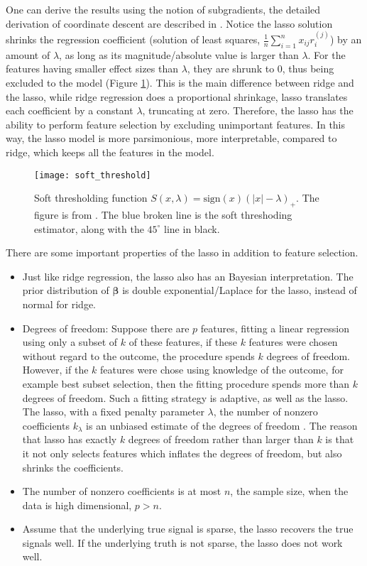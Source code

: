 One can derive the results using the notion of subgradients, the detailed derivation of coordinate descent are described in \cite{friedman2007pathwise}. Notice the lasso solution shrinks the regression coefficient (solution of least squares, $\frac{1}{n}\sum_{i=1}^{n}x_{ij}r_i^{(j)}$) by an amount of $\lambda$, as long as its magnitude/absolute value is larger than $\lambda$. For the features having smaller effect sizes than $\lambda$, they are shrunk to 0, thus being excluded to the model (Figure \ref{fig:soft_threshold}). This is the main difference between ridge and the lasso, while ridge regression does a proportional shrinkage, lasso translates each coefficient by a constant $\lambda$, truncating at zero. Therefore, the lasso has the ability to perform feature selection by excluding unimportant features. In this way, the lasso model is more parsimonious, more interpretable, compared to ridge, which keeps all the features in the model.
\begin{figure}[tbh]
  \centering
  \texttt{[image: soft\_threshold]}
  \caption[Soft thresholding function $S(x, \lambda)=\text{sign}(x)(|x|-\lambda)_+$]{
    Soft thresholding function $S(x, \lambda)=\text{sign}(x)(|x|-\lambda)_+$. The figure is from \cite{hastie2019statistical}. The blue broken line is the soft threshoding estimator, along with the $45^{\circ}$ line in black.
  }
  \label{fig:soft_threshold}
\end{figure}

There are some important properties of the lasso in addition to feature selection.
\begin{itemize}
    \item Just like ridge regression, the lasso also has an Bayesian interpretation. The prior distribution of $\bm{\beta}$ is double exponential/Laplace for the lasso, instead of normal for ridge.
    \item Degrees of freedom: Suppose there are $p$ features, fitting a linear regression using only a subset of $k$ of these features, if these $k$ features were chosen without regard to the outcome, the procedure spends $k$ degrees of freedom. However, if the $k$ features were chose using knowledge of the outcome, for example best subset selection, then the fitting procedure spends more than $k$ degrees of freedom. Such a fitting strategy is adaptive, as well as the lasso. The lasso, with a fixed penalty parameter $\lambda$, the number of nonzero coefficients $k_\lambda$ is an unbiased estimate of the degrees of freedom \citep{zou2007degrees, tibshirani2012degrees}. The reason that lasso has exactly $k$ degrees of freedom rather than larger than $k$ is that it not only selects features which inflates the degrees of freedom, but also shrinks the coefficients. 
    \item The number of nonzero coefficients is at most $n$, the sample size, when the data is high dimensional, $p>n$.
    \item Assume that the underlying true signal is sparse, the lasso recovers the true signals well. If the underlying truth is not sparse, the lasso does not work well. 
\end{itemize}

